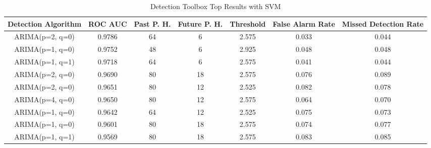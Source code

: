 \begin{table*}[h!]
\centering
\caption{Detection Toolbox Top Results with SVM}
    \label{table:svmexperimenttwotop3}
    \begin{tabular}{|c|c|c|c|c|c|c|}
        \hline
        Detection Algorithm & ROC AUC & Past P. H. & Future P. H. & Threshold & False Alarm Rate & Missed Detection Rate \\
        \hline
        \hline
        ARIMA(p=2, q=0) & 0.9786 & 64 & 6 & 2.575 &  0.033 & 0.044 \\
        \hline
        ARIMA(p=1, q=0) & 0.9752 & 48 & 6 & 2.925 &  0.048 & 0.048 \\
        \hline
        ARIMA(p=1, q=1) & 0.9718 & 64 & 6 & 2.575 &  0.041 & 0.044 \\
        \hline
        ARIMA(p=2, q=0) & 0.9690 & 80 & 18 & 2.575 &  0.076 & 0.089 \\
        \hline
        ARIMA(p=2, q=0) & 0.9651 & 80 & 12 & 2.525 &  0.082 & 0.078 \\
        \hline
        ARIMA(p=4, q=0) & 0.9650 & 80 & 12 & 2.575 &  0.064 & 0.070 \\
        \hline
        ARIMA(p=1, q=0) & 0.9642 & 64 & 12 & 2.525 &  0.075 & 0.073 \\
        \hline
        ARIMA(p=1, q=0) & 0.9601 & 80 & 18 & 2.575 &  0.074 & 0.077 \\
        \hline
        ARIMA(p=1, q=1) & 0.9569 & 80 & 18 & 2.575 &  0.083 & 0.085 \\
        \hline
    \end{tabular}
\end{table*}
